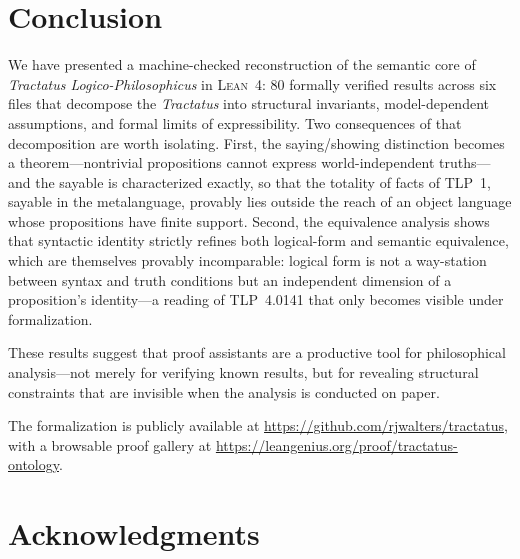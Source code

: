 \documentclass[jsl,bibother]{asl}
\theoremstyle{definition}
\theoremstyle{remark}
\newcommand{\Lean}{\textsc{Lean}}
\begin{document}
\section{Conclusion}
\label{sec:conclusion}

We have presented a machine-checked reconstruction of the
semantic core of \emph{Tractatus Logico-Philosophicus} in
\Lean~4: 80 formally verified results across six files that
decompose the \emph{Tractatus} into structural invariants,
model-dependent assumptions, and formal limits of
expressibility.  Two consequences of that decomposition are
worth isolating.  First, the saying/showing distinction becomes
a theorem---nontrivial propositions cannot express
world-independent truths---and the sayable is characterized
exactly, so that the totality of facts of TLP~1, sayable in the
metalanguage, provably lies outside the reach of an object
language whose propositions have finite support.  Second, the
equivalence analysis shows that syntactic identity strictly
refines both logical-form and semantic equivalence, which are
themselves provably incomparable: logical form is not a
way-station between syntax and truth conditions but an
independent dimension of a proposition's identity---a reading of
TLP~4.0141 that only becomes visible under formalization.

These results suggest that proof assistants are a productive tool
for philosophical analysis---not merely for verifying known
results, but for revealing structural constraints that are
invisible when the analysis is conducted on paper.

The formalization is publicly available at
\url{https://github.com/rjwalters/tractatus}, with a
browsable proof gallery at
\url{https://leangenius.org/proof/tractatus-ontology}.

\section*{Acknowledgments}
\end{document}
